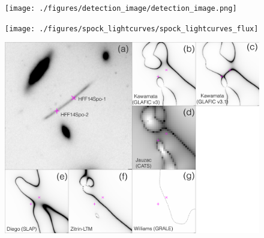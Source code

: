 \documentclass{nature_arxiv}
\begin{document}
\maketitle

\vspace{10pt}

\vspace{10pt}

\makeaffil

\begin{multicols}{2}


\begin{figure}[tbp]
\begin{center}
\texttt{[image: ./figures/detection\_image/detection\_image.png]}
\caption{ \protect}
\end{center}
\end{figure}


\begin{figure}[tbp]
\begin{center}
\texttt{[image: ./figures/spock\_lightcurves/spock\_lightcurves\_flux]}
\caption{ \protect}
\end{center}
\end{figure}

\begin{figure}[tbp]
  \begin{center}
    \includegraphics[width=\textwidth]{./figures/spock_critical_curves/spock_critical_curves}
    \caption{\protect}
  \end{center}
\end{figure}


\end{multicols}
\end{document}

